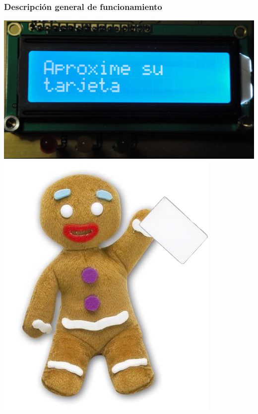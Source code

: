 \documentclass{beamer}
\begin{document}
\begin{frame}
	\frametitle{Descripción general de funcionamiento}
	\begin{center}
		\includegraphics[scale=.08]{Imagenes/Aproxime.jpg}
		\includegraphics[scale=.35]{Imagenes/pinpon_tarj.png}
	\end{center}
\end{frame}	
\end{document}
